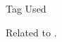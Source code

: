 \begin{pattern}{Tag}
Used 

\instances{}

\detection{}

\discussion{}

\related{}
Related to .

\end{pattern}